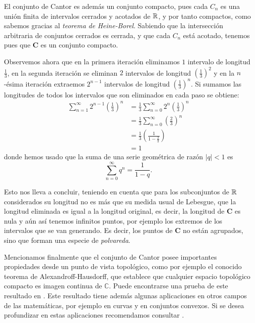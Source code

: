 El conjunto de Cantor es además un conjunto compacto, pues cada $C_n$ es una unión finita de intervalos cerrados y acotados de $\mathbb{R}$, y por tanto compactos, como sabemos gracias al \textit{teorema de Heine-Borel}. Sabiendo que la intersección arbitraria de conjuntos cerrados es cerrada, y que cada $C_n$ está acotado, tenemos pues que $\mathbf{C}$ es un conjunto compacto.

Observemos ahora que en la primera iteración eliminamos $1$ intervalo de longitud $\frac 1 3$, en la segunda iteración se eliminan $2$ intervalos de longitud $\left(\frac{1}{3}\right)^2$ y en la $n$-ésima iteración extraemos $2^{n-1}$ intervalos de longitud $\left(\frac{1}{3}\right)^n$. Si sumamos las longitudes de todos los intervalos que son eliminados en cada paso se obtiene:
\begin{equation*}
  \begin{split}
    \sum_{n=1}^\infty 2^{n-1}\left(\frac 1 3\right)^n  &= \frac 1 3  \sum_{n=0}^\infty 2^n\left(\frac 1 3\right)^n \\
    &=  \frac 1 3  \sum_{n=0}^\infty \left(\frac 2 3\right)^n \\
    &= \frac{1}{3} \left(\frac{1}{1-\frac{2}{3}}\right) \\
    &= 1
  \end{split}
\end{equation*}
donde hemos usado que la suma de una serie geométrica de razón $|q|<1$ es $$\sum_{n=0}^\infty q^n = \frac{1}{1-q}.$$

Esto nos lleva a concluir, teniendo en cuenta que para los subconjuntos de $\mathbb{R}$ considerados su longitud no es más que su medida usual de Lebesgue, que la longitud eliminada es igual a la longitud original, es decir, la longitud de $\mathbf C$ es nula y aún así tenemos infinitos puntos, por ejemplo los extremos de los intervalos que se van generando. Es decir, los puntos de $\mathbf{C}$ no están agrupados, sino que forman una especie de \textit{polvareda}.

Mencionamos finalmente que el conjunto de Cantor posee importantes propiedades desde un punto de vista topológico, como por ejemplo el conocido teorema de Alexandroff-Hausdorff, que establece que cualquier espacio topológico compacto es imagen continua de $\mathbb C$. Puede encontrarse una prueba de este resultado en \cite{Dreher}. Este resultado tiene además algunas aplicaciones en otros campos de las matemáticas, por ejemplo en curvas y en conjuntos convexos. Si se desea profundizar en estas aplicaciones recomendamos consultar \cite{Benyamini}.

